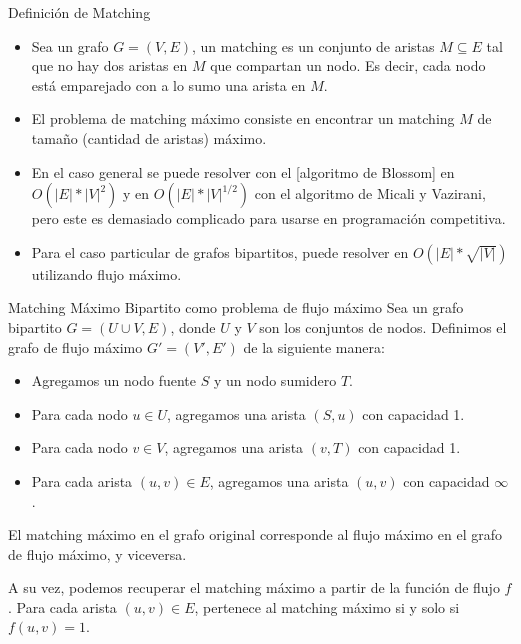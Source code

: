 \documentclass{beamer}
\begin{document}
    \begin{frame}{Definición de Matching}
        \begin{itemize}
        \item Sea un grafo $G = (V,E)$, un matching es un conjunto de aristas $M \subseteq E$ tal que no hay dos aristas en $M$ que compartan un nodo. Es decir, cada nodo está emparejado con a lo sumo una arista en $M$.

        \item El problema de matching máximo consiste en encontrar un matching $M$ de tamaño (cantidad de aristas) máximo.

        \item En el caso general se puede resolver con el  \href{https://en.wikipedia.org/wiki/Blossom_algorithm}[algoritmo de Blossom] en $O(|E|*|V|^2)$ y en $O(|E|*|V|^{1/2})$ con el algoritmo de Micali y Vazirani, pero este es demasiado complicado para usarse en programación competitiva.

        \item Para el caso particular de grafos bipartitos, puede resolver en $O(|E|*\sqrt{|V|})$ utilizando flujo máximo.
        \end{itemize}
    \end{frame}
    
    \pause

    \begin{frame}{Matching Máximo Bipartito como problema de flujo máximo}
        Sea un grafo bipartito $G = (U \cup V, E)$, donde $U$ y $V$ son los conjuntos de nodos. Definimos el grafo de flujo máximo $G' = (V', E')$ de la siguiente manera:
        \begin{itemize}
            \item Agregamos un nodo fuente $S$ y un nodo sumidero $T$.
            \item Para cada nodo $u \in U$, agregamos una arista $(S,u)$ con capacidad 1.
            \item Para cada nodo $v \in V$, agregamos una arista $(v,T)$ con capacidad 1.
            \item Para cada arista $(u,v) \in E$, agregamos una arista $(u,v)$ con capacidad $\infty$.
        \end{itemize}

        El matching máximo en el grafo original corresponde al flujo máximo en el grafo de flujo máximo, y viceversa.
        
        A su vez, podemos recuperar el matching máximo a partir de la función de flujo $f$. Para cada arista $(u,v) \in E$, pertenece al matching máximo si y solo si $f(u,v) = 1$.
    \end{frame}
\end{document}
